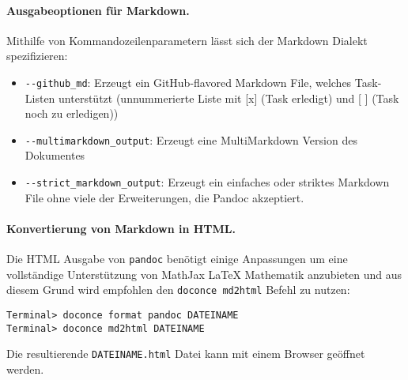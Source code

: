 \documentclass[%
oneside,                 %
final,                   %
chapterprefix=true,      %
open=right,              %
10pt]{book}
\begin{document}
\paragraph{ Ausgabeoptionen für Markdown.}
Mithilfe von Kommandozeilenparametern lässt sich der Markdown Dialekt spezifizieren:
\begin{itemize}
\item \Verb!--github_md!: Erzeugt ein GitHub-flavored Markdown File, welches Task-Listen unterstützt (unnummerierte Liste mit [x] (Task erledigt) und [ ] (Task noch zu erledigen))

\item \Verb!--multimarkdown_output!: Erzeugt eine MultiMarkdown Version des Dokumentes

\item \Verb!--strict_markdown_output!: Erzeugt ein einfaches oder striktes Markdown File ohne viele der Erweiterungen, die Pandoc akzeptiert.
\end{itemize}

\noindent
\paragraph{ Konvertierung von Markdown in HTML.}
Die HTML Ausgabe von \texttt{pandoc} benötigt einige Anpassungen um eine vollständige Unterstützung von MathJax {\LaTeX} Mathematik anzubieten und aus diesem Grund wird empfohlen den \texttt{doconce md2html} Befehl zu nutzen:
\begin{verbatim}
Terminal> doconce format pandoc DATEINAME
Terminal> doconce md2html DATEINAME
\end{verbatim}
Die resultierende \texttt{DATEINAME.html} Datei kann mit einem Browser geöffnet werden.
\end{document}
